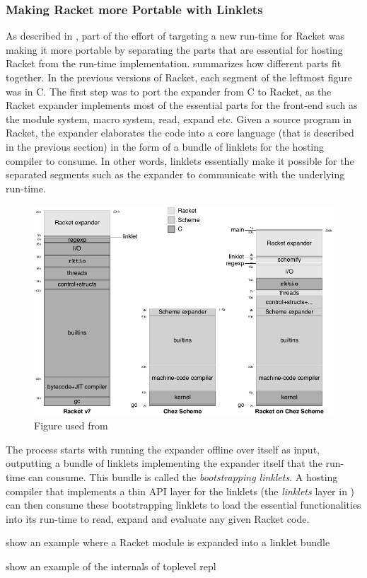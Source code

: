 \newpage

\subsubsection{Making Racket more Portable with Linklets}

As described in , part of the effort of targeting a
new run-time for Racket was making it more portable by separating the
parts that are essential for hosting Racket from the run-time
implementation.  summarizes how different
parts fit together. In the previous versions of Racket, each segment
of the leftmost figure was in C. The first step was to port the
expander from C to Racket, as the Racket expander implements most of
the essential parts for the front-end such as the module system, macro
system, read, expand etc. Given a source program in Racket, the
expander elaborates the code into a core language (that is described
in the previous section) in the form of a bundle of linklets for the
hosting compiler to consume. In other words, linklets essentially make
it possible for the separated segments such as the expander to
communicate with the underlying run-time.

\begin{figure}[h]
  \centering
  \includegraphics[scale=0.4]{img/racket-portable}
  \caption{Figure used from \cite{racket-on-chez-19}}
  \label{fig:racket-portable}
\end{figure}

The process starts with running the expander offline over itself as
input, outputting a bundle of linklets implementing the expander
itself that the run-time can consume. This bundle is called the
\emph{bootstrapping linklets}. A hosting compiler that implements a
thin API layer for the linklets (the \emph{linklets} layer in
) can then consume these bootstrapping
linklets to load the essential functionalities into its run-time to
read, expand and evaluate any given Racket code.


show an example where a Racket module is expanded into a linklet
bundle

show an example of the internals of toplevel repl
